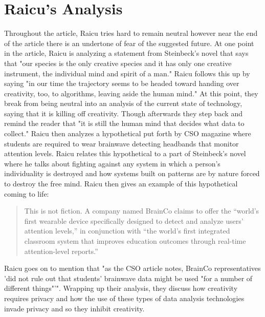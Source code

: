 \documentclass[notitlepage,a4paper,12pt]{article}
\begin{document}
\section*{Raicu's Analysis}
Throughout the article, Raicu tries hard to remain neutral however near the end of the article there is an undertone of fear of the suggested future. At one point in the article, Raicu is analyzing a statement from Steinbeck's novel that says that "our species is the only creative species and it has only one creative instrument, the individual mind and spirit of a man." Raicu follows this up by saying "in our time the trajectory seems to be headed toward handing over creativity, too, to algorithms, leaving aside the human mind." At this point, they break from being neutral into an analysis of the current state of technology, saying that it is killing off creativity. Though afterwards they step back and remind the reader that "it is still the human mind that decides what data to collect." Raicu then analyzes a hypothetical put forth by CSO magazine where students are required to wear brainwave detecting headbands that monitor attention levels. Raicu relates this hypothetical to a part of Steinbeck's novel where he talks about fighting against any system in which a person's individuality is destroyed and how systems built on patterns are by nature forced to destroy the free mind. Raicu then gives an example of this hypothetical coming to life:
\begin{quote}
This is not fiction. A company named BrainCo claims to offer the “world’s first wearable device specifically designed to detect and analyze users’ attention levels,” in conjunction with “the world’s first integrated classroom system that improves education outcomes through real-time attention-level reports.”
\end{quote}
Raicu goes on to mention that "as the CSO article notes, BrainCo representatives 'did not rule out that students' brainwave data might be used "for a number of different things"'". Wrapping up their analysis, they discuss how creativity requires privacy and how the use of these types of data analysis technologies invade privacy and so they inhibit creativity.
\end{document}
